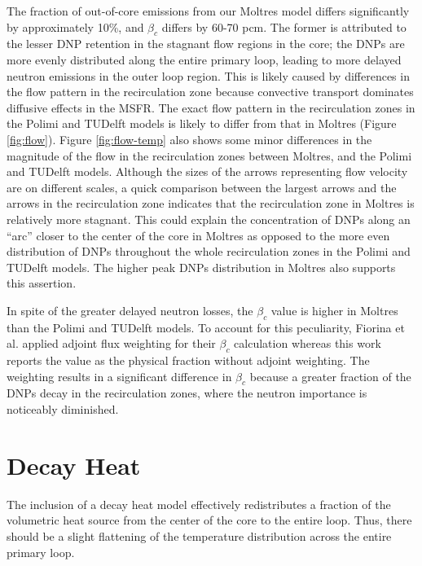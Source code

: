 The fraction of out-of-core emissions from our Moltres model
differs significantly by approximately 10\%, and $\beta_c$ differs by
60-70 pcm. The former is attributed to the lesser \gls{DNP} retention in the
stagnant flow regions in the core; the \glspl{DNP} are more evenly distributed
along the entire primary loop, leading to more delayed neutron emissions in
the outer loop region. This is likely caused by differences in the
flow pattern in the recirculation zone because convective transport
dominates diffusive effects in the \gls{MSFR}. The exact flow pattern in the
recirculation zones in the Polimi and TUDelft models is likely to differ from
that in Moltres (Figure \ref{fig:flow}). Figure \ref{fig:flow-temp} also shows
some minor differences in the magnitude of the flow in the recirculation zones
between Moltres, and the Polimi and TUDelft models. Although the sizes of the
arrows representing flow velocity are on different scales, a
quick comparison between the largest arrows and the arrows in the
recirculation zone indicates that the recirculation zone in Moltres is
relatively more stagnant. This could explain the concentration of \glspl{DNP}
along an ``arc'' closer to the center of the core in Moltres as opposed to the
more even distribution of \glspl{DNP} throughout the whole recirculation zones
in the Polimi and TUDelft models. The higher peak \glspl{DNP} distribution in
Moltres also supports this assertion.

In spite of the greater delayed neutron losses, the $\beta_c$ value is higher
in Moltres than the Polimi and TUDelft models. To account for this
peculiarity, Fiorina et al. \cite{fiorina_modelling_2014} applied adjoint flux
weighting for their $\beta_c$ calculation whereas this work
reports the value as the physical fraction without adjoint weighting. The
weighting results in a significant difference in $\beta_c$ because a greater
fraction of the \glspl{DNP} decay in the recirculation zones, where the
neutron importance is noticeably diminished.

\section{Decay Heat}

The inclusion of a decay heat model effectively redistributes a fraction of
the volumetric heat source from the center of the core to the entire loop.
Thus, there should be a slight flattening of the temperature distribution
across the entire primary loop.
